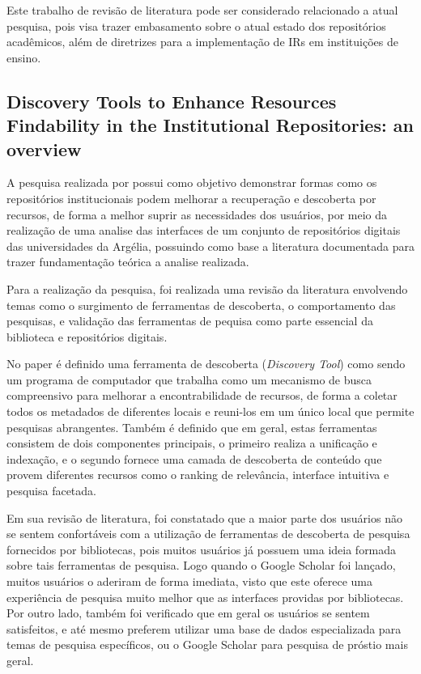 Este trabalho de revisão de literatura pode ser considerado relacionado
a atual pesquisa, pois visa trazer embasamento sobre o atual estado
dos repositórios acadêmicos, além de diretrizes para a implementação
de IRs em instituições de ensino.

\subsection{Discovery Tools to Enhance Resources Findability in the Institutional Repositories: an overview}

A pesquisa realizada por \cite{2019:Mettai} possui como objetivo demonstrar
formas como os repositórios institucionais podem melhorar a recuperação e
descoberta por recursos, de forma a melhor suprir as necessidades dos usuários,
por meio da realização de uma analise das interfaces de um conjunto
de repositórios digitais das universidades da Argélia, possuindo como base
a literatura documentada para trazer fundamentação teórica a analise realizada.

Para a realização da pesquisa, foi realizada uma revisão da literatura
envolvendo temas como o surgimento de ferramentas de descoberta, o comportamento
das pesquisas, e validação das ferramentas de pequisa como parte essencial da
biblioteca e repositórios digitais.

No paper é definido uma ferramenta de descoberta (\emph{Discovery Tool}) como
sendo um programa de computador que trabalha como um mecanismo de busca
compreensivo para melhorar a encontrabilidade de recursos, de forma a coletar
todos os metadados de diferentes locais e reuni-los em um único local que
permite pesquisas abrangentes. Também é definido que em geral, estas ferramentas
consistem de dois componentes principais, o primeiro realiza a unificação
e indexação, e o segundo fornece uma camada de descoberta de conteúdo que
provem diferentes recursos como o ranking de relevância, interface intuitiva
e pesquisa facetada.

Em sua revisão de literatura, foi constatado que a maior parte dos usuários
não se sentem confortáveis com a utilização de ferramentas de descoberta de
pesquisa fornecidos por bibliotecas, pois muitos usuários já possuem uma ideia
formada sobre tais ferramentas de pesquisa. Logo quando o Google Scholar
foi lançado, muitos usuários o aderiram de forma imediata, visto que este oferece
uma experiência de pesquisa muito melhor que as interfaces providas por bibliotecas.
Por outro lado, também foi verificado que em geral os usuários se sentem
satisfeitos, e até mesmo preferem utilizar uma base de dados especializada
para temas de pesquisa específicos, ou o Google Scholar para pesquisa de
próstio mais geral.

